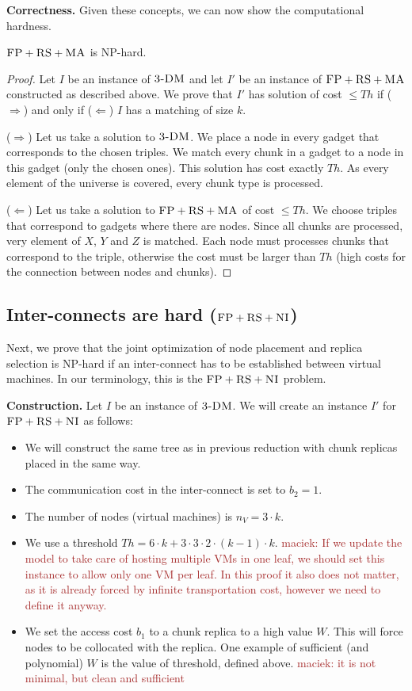 \documentclass[9pt]{sigcomm-alternate}
\newcommand{\maciek}[1]{\textcolor{brown}{maciek: #1}}
\newcommand{\CC}{\textsc{NI}}
\newcommand{\FP}{\textsc{FP}}
\newcommand{\RS}{\textsc{RS}}
\newcommand{\MA}{\textsc{MA}}
\newcommand{\CostTrans}{\ensuremath{b_1}}
\newcommand{\CostCom}{\ensuremath{b_2}}
\newcommand{\Vms}{\ensuremath{n_V}}
\newcommand{\TDM}{\textsc{3-DM}}
\newcommand{\Thr}{\ensuremath{Th}}
\begin{document}
\textbf{Correctness.}
Given these concepts, we can now show the computational hardness.
\begin{theorem}
$\FP+\RS+\MA$ is NP-hard.
\end{theorem}
\begin{proof}
Let $I$ be an instance of $\TDM$ and let $I'$ be an instance of
$\FP+\RS+\MA$ constructed as described above.
We prove that $I'$ has solution of cost $\leq \Thr$ if ($\Rightarrow$) and only if
($\Leftarrow$)
$I$ has a matching of size $k$.

($\Rightarrow$) Let us take a solution to $\TDM$. We place a node in every
gadget that corresponds to the chosen triples. We match every chunk in a
gadget to a node in this gadget (only the chosen ones). This solution has
cost exactly $\Thr$. As every element of the universe is covered, every
chunk type is processed.

($\Leftarrow$) Let us take a solution to $\FP+\RS+\MA$ of cost $\leq \Thr$. We
choose triples that correspond to gadgets where there are nodes. Since
all chunks are processed, very element of $X$, $Y$ and $Z$ is matched. Each
node must processes chunks that correspond to the triple, otherwise the
cost must be larger than $\Thr$ (high costs for the connection between
nodes and chunks).
\end{proof}


\subsection{Inter-connects are hard ($\FP+\RS+\CC$)}\label{ssec:fprscc}

Next, we prove that the joint optimization of node placement and replica selection
is NP-hard if an inter-connect has to be established between virtual machines.
In our terminology, this is the $\FP+\RS+\CC$ problem.

\textbf{Construction.}
Let $I$ be an instance of $\TDM$. We will create an instance $I'$
for $\FP+\RS+\CC$ as follows:
\begin{itemize}
\item We will construct the same tree as in previous reduction with
chunk replicas placed in the same way.
\item The communication cost in the inter-connect is set to $\CostCom = 1$.
\item The number of nodes (virtual machines) is $\Vms = 3 \cdot k$.
\item We use a threshold $\Thr =  6 \cdot k + 3 \cdot 3 \cdot 2 \cdot
(k - 1) \cdot k$.  \maciek{If we update the model to take care of hosting
  multiple VMs in one leaf, we should set this instance to allow only
  one VM per leaf. In this proof it also does not matter, as it is
  already forced by infinite transportation cost, however we need to
  define it anyway.
  }
\item We set the access cost $\CostTrans$ to a chunk replica to a high value $W$. This will force
nodes to be collocated with the replica. One example of sufficient
(and polynomial) $W$
is the value of threshold, defined above. \maciek{it is not minimal,
  but clean and sufficient}
\end{itemize}
\end{document}
